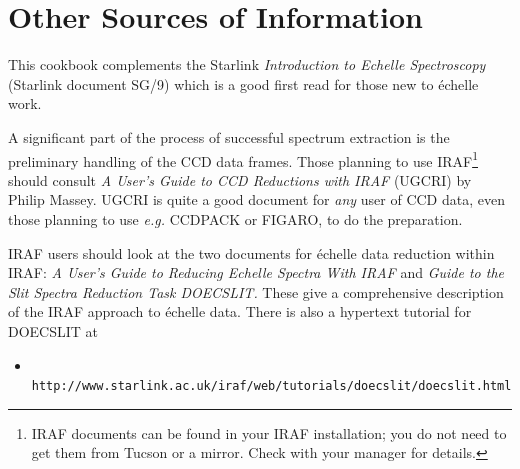 \documentclass[twoside,11pt]{article}
\newcommand{\stardocinitials}  {SC}
\newcommand{\stardocnumber}    {3.2-0} %
\newcommand{\stardocname}{\stardocinitials /\stardocnumber}
\newcommand{\htmladdnormallink}[2]{#1}
\newcommand{\htmlref}[2]{#1}
\newcommand{\xref}[3]{#1}
\newcommand{\xlabel}[1]{}
\renewcommand{\_}{\texttt{\symbol{95}}}
\newcommand{\scspec}[2]{#1}
\newcommand{\scspec}[2]{#2}
\begin{document}
\section{\label{se_other_sources}\xlabel{other_information}Other Sources of
         Information}
\markboth{Other Sources of Information}{\stardocname}

This cookbook complements the Starlink \xref{{\sl Introduction to Echelle
Spectroscopy} (Starlink document SG/9)}{sg9}{} which is a good first read for
those new to \'{e}chelle work.

A significant part of the process of successful spectrum extraction
is the preliminary handling of the \htmlref{CCD}{gl_ccd} data frames.
Those planning to use
%
\htmladdnormallink{IRAF}
{http://www.starlink.ac.uk/iraf/web/}\scspec{\footnote{IRAF
documents can be found in your IRAF installation; you
do not need to get them from Tucson or a mirror.  Check with your manager for
details.}}{{\bf (All IRAF-related hyperlinks in this document are to the
UK-based Starlink IRAF mirror except \htmladdnormallink{this one}
{http://iraf.noao.edu/} which goes to the Tucson site.)}} should consult
\htmladdnormallink{{\sl A User's Guide to CCD Reductions with IRAF}}
{ftp://ftp.starlink.ac.uk/pub/iraf/iraf/docs/ccduser2.ps.Z} (UGCRI) by Philip Massey.
UGCRI is quite a good document for {\em any} user of CCD data, even those
planning to use {\em e.g.} \xref{CCDPACK}{sun139}{} or
\xref{FIGARO}{sun86}{}, to do the preparation.

IRAF users should look at the two documents for \'{e}chelle data reduction
within IRAF:
\htmladdnormallink{{\sl A User's Guide to Reducing Echelle Spectra With IRAF}}
{ftp://ftp.starlink.ac.uk/pub/iraf/iraf/docs/ech.ps.Z}
and
\htmladdnormallink{{\sl Guide to the Slit Spectra Reduction Task DOECSLIT.}}
{ftp://ftp.starlink.ac.uk/pub/iraf/iraf/docs/doecslit.ps.Z}
These give a comprehensive description of the IRAF approach to \'{e}chelle
data.  There is also a hypertext tutorial for DOECSLIT at

\begin{itemize}

\item \htmladdnormallink{{\tt
      http://www.starlink.ac.uk/iraf/web/tutorials/doecslit/doecslit.html}}
      {http://www.starlink.ac.uk/iraf/web/tutorials/doecslit/doecslit.html}

\end{itemize}
\end{document}
